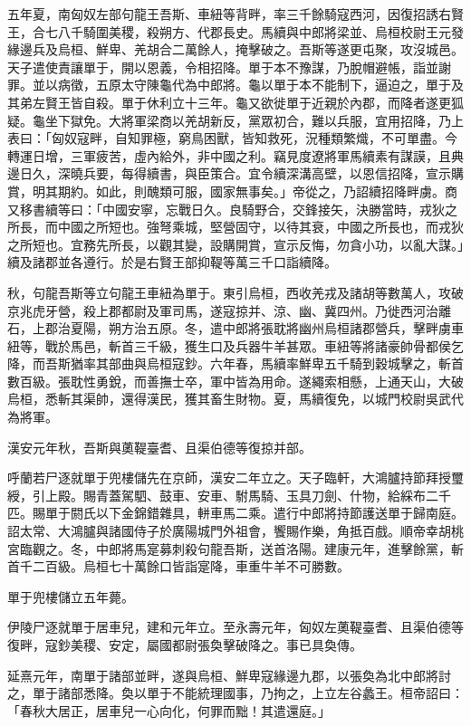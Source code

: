 \begin{pinyinscope}
五年夏，南匈奴左部句龍王吾斯、車紐等背畔，率三千餘騎寇西河，因復招誘右賢王，合七八千騎圍美稷，殺朔方、代郡長史。馬續與中郎將梁並、烏桓校尉王元發緣邊兵及烏桓、鮮卑、羌胡合二萬餘人，掩擊破之。吾斯等遂更屯聚，攻沒城邑。天子遣使責讓單于，開以恩義，令相招降。單于本不豫謀，乃脫帽避帳，詣並謝罪。並以病徵，五原太守陳龜代為中郎將。龜以單于本不能制下，逼迫之，單于及其弟左賢王皆自殺。單于休利立十三年。龜又欲徙單于近親於內郡，而降者遂更狐疑。龜坐下獄免。大將軍梁商以羌胡新反，黨眾初合，難以兵服，宜用招降，乃上表曰：「匈奴寇畔，自知罪極，窮鳥困獸，皆知救死，況種類繁熾，不可單盡。今轉運日增，三軍疲苦，虛內給外，非中國之利。竊見度遼將軍馬續素有謀謨，且典邊日久，深曉兵要，每得續書，與臣策合。宜令續深溝高壁，以恩信招降，宣示購賞，明其期約。如此，則醜類可服，國家無事矣。」帝從之，乃詔續招降畔虜。商又移書續等曰：「中國安寧，忘戰日久。良騎野合，交鋒接矢，決勝當時，戎狄之所長，而中國之所短也。強弩乘城，堅營固守，以待其衰，中國之所長也，而戎狄之所短也。宜務先所長，以觀其變，設購開賞，宣示反悔，勿貪小功，以亂大謀。」續及諸郡並各遵行。於是右賢王部抑鞮等萬三千口詣續降。

秋，句龍吾斯等立句龍王車紐為單于。東引烏桓，西收羌戎及諸胡等數萬人，攻破京兆虎牙營，殺上郡都尉及軍司馬，遂寇掠并、涼、幽、冀四州。乃徙西河治離石，上郡治夏陽，朔方治五原。冬，遣中郎將張耽將幽州烏桓諸郡營兵，擊畔虜車紐等，戰於馬邑，斬首三千級，獲生口及兵器牛羊甚眾。車紐等將諸豪帥骨都侯乞降，而吾斯猶率其部曲與烏桓寇鈔。六年春，馬續率鮮卑五千騎到穀城擊之，斬首數百級。張耽性勇銳，而善撫士卒，軍中皆為用命。遂繩索相懸，上通天山，大破烏桓，悉斬其渠帥，還得漢民，獲其畜生財物。夏，馬續復免，以城門校尉吳武代為將軍。

漢安元年秋，吾斯與薁鞮臺耆、且渠伯德等復掠并部。

呼蘭若尸逐就單于兜樓儲先在京師，漢安二年立之。天子臨軒，大鴻臚持節拜授璽綬，引上殿。賜青蓋駕駟、鼓車、安車、駙馬騎、玉具刀劍、什物，給綵布二千匹。賜單于閼氏以下金錦錯雜具，軿車馬二乘。遣行中郎將持節護送單于歸南庭。詔太常、大鴻臚與諸國侍子於廣陽城門外祖會，饗賜作樂，角抵百戲。順帝幸胡桃宮臨觀之。冬，中郎將馬寔募刺殺句龍吾斯，送首洛陽。建康元年，進擊餘黨，斬首千二百級。烏桓七十萬餘口皆詣寔降，車重牛羊不可勝數。

單于兜樓儲立五年薨。

伊陵尸逐就單于居車兒，建和元年立。至永壽元年，匈奴左薁鞮臺耆、且渠伯德等復畔，寇鈔美稷、安定，屬國都尉張奐擊破降之。事已具奐傳。

延熹元年，南單于諸部並畔，遂與烏桓、鮮卑寇緣邊九郡，以張奐為北中郎將討之，單于諸部悉降。奐以單于不能統理國事，乃拘之，上立左谷蠡王。桓帝詔曰：「春秋大居正，居車兒一心向化，何罪而黜！其遣還庭。」


\end{pinyinscope}
